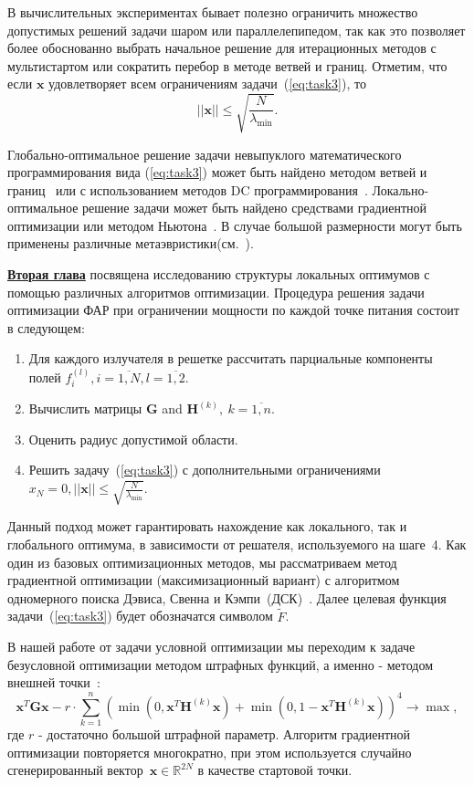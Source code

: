 В вычислительных экспериментах бывает полезно ограничить множество допустимых решений задачи шаром или параллелепипедом, так как это позволяет более обоснованно выбрать начальное решение для итерационных методов с мультистартом или сократить перебор в методе ветвей и границ. Отметим, что если $\textbf{x}$ удовлетворяет всем ограничениям задачи~(\ref{eq:task3}), то
\begin{equation} \label{eqn:bound}
||\textbf{x}||\le \sqrt{\frac{N}{\lambda_{\min}}}.
\end{equation}

Глобально-оптимальное решение задачи невыпуклого математического программирования вида (\ref{eq:task3}) может быть найдено методом
ветвей и границ~\cite{horst:global,tawarmalani:global} или с использованием методов DC программирования~\cite{horst:handbook,strekalovsky:global}. Локально-оптимальное решение задачи может быть найдено средствами градиентной оптимизации или методом Ньютона~\cite{himmelblau:nlp}. В случае большой размерности могут быть применены различные метаэвристики(см.~\cite{eberhart:swarm,storn:de}).

\underline{\textbf{Вторая глава}} посвящена исследованию структуры локальных оптимумов с помощью различных алгоритмов оптимизации.
Процедура решения задачи оптимизации ФАР при ограничении мощности по каждой точке питания состоит в следующем:
%
\begin{enumerate}
  \item Для каждого излучателя в решетке рассчитать парциальные компоненты полей $f_i^{(l)}, i= \overline{1,N}, l=\overline{1,2}$.
  \item Вычислить матрицы $\textbf{G}$ and ${\textbf{H}}^{(k)},\ k=\overline{1,n}$.
  \item Оценить радиус допустимой области.
  \item Решить задачу~(\ref{eq:task3}) с дополнительными ограничениями $x_N = 0, ||\textbf{x}||\le \sqrt{\frac{N}{\lambda_{\min}}}$.
\end{enumerate}

Данный подход может гарантировать нахождение как локального, так и глобального оптимума, в зависимости от решателя, используемого на шаге~4. Как один из базовых оптимизационных методов, мы рассматриваем метод градиентной оптимизации (максимизационный вариант)
с алгоритмом одномерного поиска Дэвиса, Свенна и Кэмпи~(ДСК)~\cite{himmelblau:nlp}. Далее целевая функция задачи~(\ref{eq:task3}) будет обозначатся символом $\tilde{F}$.

В нашей работе от задачи условной оптимизации мы переходим к задаче безусловной оптимизации методом штрафных функций, а именно -
методом внешней точки~\cite{eremin:convex,aoki:mo}:
\begin{equation}
       \textbf{x}^{T}\textbf{Gx} - r\cdot \sum_{k=1}^n
       \left( \min\left(0,\textbf{x}^{T}\textbf{H}^{(k)}\textbf{x}\right) +
       \min\left(0,1-\textbf{x}^{T}\textbf{H}^{(k)}\textbf{x}\right)\right)^4 \rightarrow
       \max,
     \label{eq:task4}
\end{equation}
где $r$ - достаточно большой штрафной параметр. Алгоритм градиентной оптимизации повторяется многократно, при этом используется случайно сгенерированный вектор~$\textbf{x}\in \mathbb{R}^{2N}$ в качестве стартовой точки.

